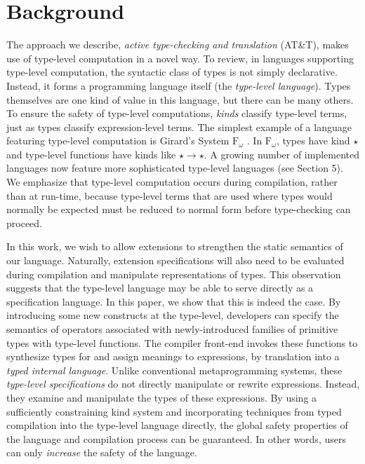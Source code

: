 \documentclass[10pt]{sigplanconf}
\begin{document}
\section{Background}
The approach we describe, {\it active type-checking and translation} (AT\&T), makes use of type-level computation in a novel way. To review, in languages supporting type-level computation, the syntactic class of types is not simply declarative. Instead, it forms a programming language itself (the {\it type-level language}). Types themselves are one kind of value in this language, but there can be many others. To ensure the safety of type-level computations, {\it kinds} classify type-level terms, just as types classify expression-level terms. The simplest example of a language featuring type-level computation is Girard's System $\text{F}_{\omega}$ \cite{tapl}. In $\text{F}_{\omega}$, types have kind $\star$ and type-level functions have kinds like $\star\rightarrow\star$. A growing number of implemented languages now feature more sophisticated type-level languages (see Section 5).  
We emphasize that type-level computation occurs during compilation, rather than at run-time, because type-level terms that are used where types would normally be expected must be reduced to normal form before type-checking can proceed. 

In this work, we wish to allow extensions to strengthen the static semantics of our language. Naturally, extension specifications will also need to be evaluated during compilation and manipulate representations of types. This observation suggests that the type-level language may be able to serve directly as a specification language. In this paper, we show that this is indeed the case. By introducing some new constructs at the type-level, developers can specify the semantics of operators associated with newly-introduced families of primitive types with type-level functions. The compiler front-end invokes these functions to synthesize types for and assign meanings to expressions, by translation into a {\it typed internal language}. Unlike conventional metaprogramming systems, these {\it type-level specifications} do not directly manipulate or rewrite expressions. Instead, they examine and manipulate the types of these expressions. 
By using a sufficiently constraining kind system and incorporating techniques from typed compilation into the type-level language directly, the global safety properties of the language and compilation process can be guaranteed. In other words, users can only {\it increase} the safety of the language.
\end{document}
